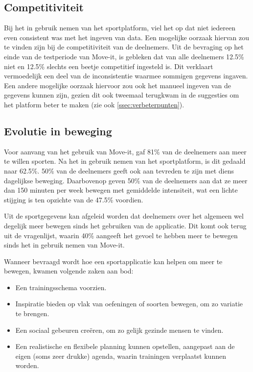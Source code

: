 \subsection{Competitiviteit}

Bij het in gebruik nemen van het sportplatform, viel het op dat niet iedereen even consistent was met het ingeven van data. Een mogelijke oorzaak hiervan zou te vinden zijn bij de competitiviteit van de deelnemers. Uit de bevraging op het einde van de testperiode van Move-it, is gebleken dat van alle deelnemers 12.5\% niet en 12.5\% slechts een beetje competitief ingesteld is. Dit verklaart vermoedelijk een deel van de inconsistentie waarmee sommigen gegevens ingaven.
Een andere mogelijke oorzaak hiervoor zou ook het manueel ingeven van de gegevens kunnen zijn, gezien dit ook tweemaal terugkwam in de suggesties om het platform beter te maken (zie ook \ref{ssec:verbeterpunten}).

\subsection{Evolutie in beweging}


Voor aanvang van het gebruik van Move-it, gaf 81\% van de deelnemers aan meer te willen sporten. Na het in gebruik nemen van het sportplatform, is dit gedaald naar 62.5\%. 50\% van de deelnemers geeft ook aan tevreden te zijn met diens dagelijkse beweging. Daarbovenop geven 50\% van de deelnemers aan dat ze meer dan 150 minuten per week bewegen met gemiddelde intensiteit, wat een lichte stijging is ten opzichte van de 47.5\% voordien.

Uit de sportgegevens kan afgeleid worden dat deelnemers over het algemeen wel degelijk meer bewegen sinds het gebruiken van de applicatie. Dit komt ook terug uit de vragenlijst, waarin 40\% aangeeft het gevoel te hebben meer te bewegen sinds het in gebruik nemen van Move-it.

Wanneer bevraagd wordt hoe een sportapplicatie kan helpen om meer te bewegen, kwamen volgende zaken aan bod:

\begin{itemize}
    \item Een trainingsschema voorzien.
    \item Inspiratie bieden op vlak van oefeningen of soorten bewegen, om zo variatie te brengen.
    \item Een sociaal gebeuren creëren, om zo gelijk gezinde mensen te vinden.
    \item Een realistische en flexibele planning kunnen opstellen, aangepast aan de eigen (soms zeer drukke) agenda, waarin trainingen verplaatst kunnen worden.
\end{itemize}

